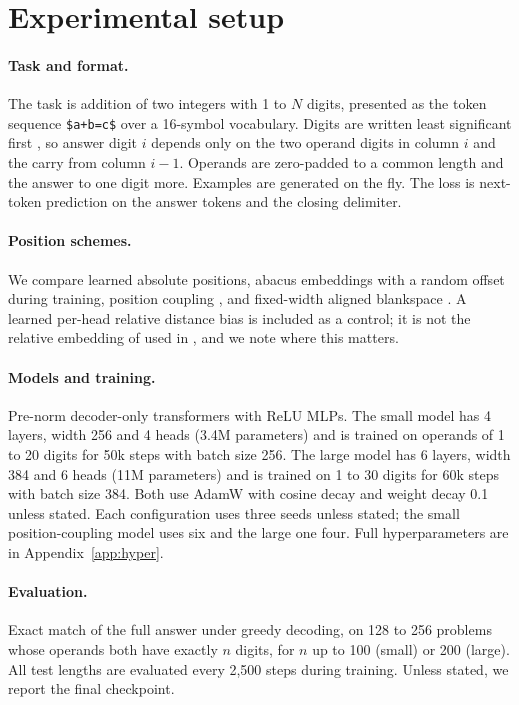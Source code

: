 \documentclass{article}
\begin{document}
\section{Experimental setup}
\label{sec:setup}

\paragraph{Task and format.} The task is addition of two integers with 1 to $N$ digits, presented as the token sequence \texttt{\$a+b=c\$} over a 16-symbol vocabulary. Digits are written least significant first \citep{lee2023teaching}, so answer digit $i$ depends only on the two operand digits in column $i$ and the carry from column $i-1$. Operands are zero-padded to a common length and the answer to one digit more. Examples are generated on the fly. The loss is next-token prediction on the answer tokens and the closing delimiter.

\paragraph{Position schemes.} We compare learned absolute positions, abacus embeddings \citep{mcleish2024transformers} with a random offset during training, position coupling \citep{cho2024position}, and fixed-width aligned blankspace \citep{aba2025}. A learned per-head relative distance bias is included as a control; it is not the relative embedding of \citet{shaw2018self} used in \citet{aba2025}, and we note where this matters.

\paragraph{Models and training.} Pre-norm decoder-only transformers with ReLU MLPs. The small model has 4 layers, width 256 and 4 heads (3.4M parameters) and is trained on operands of 1 to 20 digits for 50k steps with batch size 256. The large model has 6 layers, width 384 and 6 heads (11M parameters) and is trained on 1 to 30 digits for 60k steps with batch size 384. Both use AdamW with cosine decay and weight decay 0.1 unless stated. Each configuration uses three seeds unless stated; the small position-coupling model uses six and the large one four. Full hyperparameters are in Appendix~\ref{app:hyper}.

\paragraph{Evaluation.} Exact match of the full answer under greedy decoding, on 128 to 256 problems whose operands both have exactly $n$ digits, for $n$ up to 100 (small) or 200 (large). All test lengths are evaluated every 2,500 steps during training. Unless stated, we report the final checkpoint.
\end{document}
